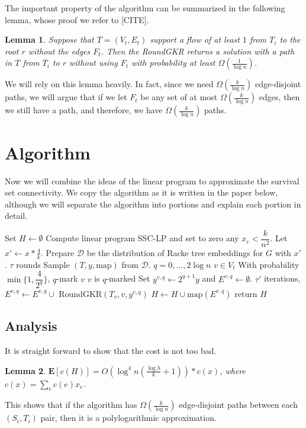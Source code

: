 \documentclass[12pt]{article}
\newtheorem{lemma}{Lemma}
\begin{document}
The important property of the algorithm can be summarized in the following lemma, whose proof we refer to [CITE].

\begin{lemma}
\label{lem:findpath}
Suppose that $T = (V_t, E_t)$ support a flow of at least $1$ from $T_i$ to the root $r$ without the edges $F_t$. Then the RoundGKR returns a solution with a path in $T$ from $T_i$ to $r$ without using $F_t$ with probability at least $\Omega(\frac{1}{\log n})$. 
\end{lemma}

We will rely on this lemma heavily. In fact, since we need $\Omega(\frac{k}{\log n})$ edge-disjoint paths, we will argue that if we let $F_t$ be any set of at most $\Omega(\frac{k}{\log n})$ edges, then we still have a path, and therefore, we have $\Omega(\frac{k}{\log n})$ paths.  

\section{Algorithm}

Now we will combine the ideas of the linear program to approximate the survival set connectivity. We copy the algorithm as it is written in the paper below, although we will separate the algorithm into portions and explain each portion in detail.
\begin{codebox}
\li Set $H \leftarrow \emptyset$
\li Compute linear program SSC-LP and set to zero any $x_e < \dfrac{k}{n^2}$.
\li Let $x' \leftarrow x*\frac{4}{k}$. 
\li Prepare $\mathcal{D}$ be the distribution of Racke tree embeddings for $G$ with $x'$.
\li \For $\tau$ rounds \Do
\li Sample $(T, y, \text{map})$ from $\mathcal{D}$. 
\li \For $q = 0, ..., 2\log n$ \Do
\li \For $v \in V_t$ \Do
\li With probability $\min\{1, \dfrac{4}{2^q}\}$, $q$-mark $v$
\li \If $v$ is $q$-marked \Then
\li Set $y^{v, q}\leftarrow 2^{q+1}y$ and $E^{v,q} \leftarrow \emptyset$.
\li \For $\tau'$ iterations, \Do
\li $E^{v,q} \leftarrow E^{v,q} \cup$ RoundGKR$(T_v, v, y^{v,q})$ \End
\li $H \leftarrow H \cup \text{map}(E^{v,q})$ \End \End \End \End
\li return $H$
\end{codebox}

\subsection{Analysis}

It is straight forward to show that the cost is not too bad.

\begin{lemma}
$\textbf{E}[c(H)] = O(\log^4n(\frac{\log h}{k}+1)) * c(x)$, where $c(x) = \sum_e c(e)x_e$. 
\end{lemma}
This shows that if the algorithm has $\Omega(\frac{k}{\log n})$ edge-disjoint paths between each $(S_i, T_i)$ pair, then it is a polylogarithmic approximation. 
\end{document}
